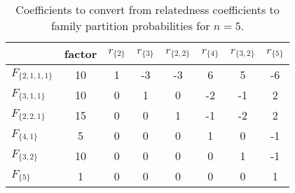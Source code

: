 \begin{table}[h]
\centering
\caption{Coefficients to convert from relatedness coefficients to family partition probabilities for $n=5$.}
\label{rho2psi5}
\begin{tabular}{lccccccc}
\toprule
                  &  factor &  $r_{\{2\}}$ &  $r_{\{3\}}$ &  $r_{\{2,2\}}$ &  $r_{\{4\}}$ &  $r_{\{3,2\}}$ &  $r_{\{5\}}$ \\
\midrule
$F_{\{2,1,1,1\}}$ &      10 &            1 &           -3 &             -3 &            6 &              5 &           -6 \\
  $F_{\{3,1,1\}}$ &      10 &            0 &            1 &              0 &           -2 &             -1 &            2 \\
  $F_{\{2,2,1\}}$ &      15 &            0 &            0 &              1 &           -1 &             -2 &            2 \\
    $F_{\{4,1\}}$ &       5 &            0 &            0 &              0 &            1 &              0 &           -1 \\
    $F_{\{3,2\}}$ &      10 &            0 &            0 &              0 &            0 &              1 &           -1 \\
      $F_{\{5\}}$ &       1 &            0 &            0 &              0 &            0 &              0 &            1 \\
\bottomrule
\end{tabular}
\end{table}

